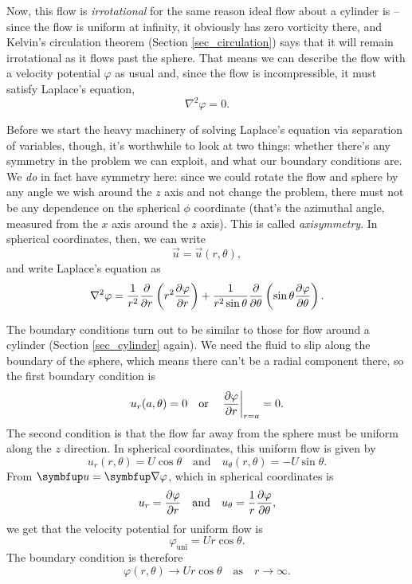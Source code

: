 Now, this flow is \emph{irrotational} for the same reason ideal flow about a cylinder is -- since the flow is uniform at infinity, it obviously has zero vorticity there, and Kelvin's circulation theorem (Section \ref{sec_circulation}) says that it will remain irrotational as it flows past the sphere.  That means we can describe the flow with a velocity potential $\varphi$ as usual and, since the flow is incompressible, it must satisfy Laplace's equation,
\[
\nabla^2 \varphi = 0.
\]

Before we start the heavy machinery of solving Laplace's equation via separation of variables, though, it's worthwhile to look at two things:  whether there's any symmetry in the problem we can exploit, and what our boundary conditions are.  We \emph{do} in fact have symmetry here:  since we could rotate the flow and sphere by any angle we wish around the $z$ axis and not change the problem, there must not be any dependence on the spherical $\phi$ coordinate (that's the azimuthal angle, measured from the $x$ axis around the $z$ axis).  This is called \emph{axisymmetry}.  In spherical coordinates, then, we can write
\begin{equation}
\vec{u} = \vec{u}(r, \theta),
\end{equation}
and write Laplace's equation as
\begin{equation}
\label{eq_laplace_sph}
\nabla^2 \varphi = \frac{1}{r^2} \frac{\partial {}}{\partial {r}} \left( r^2 \frac{\partial {\varphi}}{\partial {r}} \right) + \frac{1}{r^2 \sin \theta} \frac{\partial {}}{\partial {\theta}} \left(\sin \theta \frac{\partial {\varphi}}{\partial {\theta}} \right).
\end{equation}

The boundary conditions turn out to be similar to those for flow around a cylinder (Section \ref{sec_cylinder} again).  We need the fluid to slip along the boundary of the sphere, which means there can't be a radial component there, so the first boundary condition is
\begin{equation}
\label{eq_sphere_bc1}
u_r(a, \theta) = 0 \quad \text{or} \quad \left. \frac{\partial {\varphi}}{\partial {r}} \right|_{r=a} = 0.
\end{equation}
The second condition is that the flow far away from the sphere must be uniform along the $z$ direction.  In spherical coordinates, this uniform flow is given by
\begin{equation}
\label{eq_sphere_uni}
u_r(r, \theta) = U\cos \theta \quad \text{and} \quad u_\theta(r, \theta) = -U \sin \theta.
\end{equation}
From $\vec{u} = \grad \varphi$, which in spherical coordinates is
\[
u_r = \frac{\partial {\varphi}}{\partial {r}} \quad \text{and} \quad u_\theta = \frac{1}{r} \frac{\partial {\varphi}}{\partial {\theta}},
\]
we get that the velocity potential for uniform flow is 
\[
\varphi_\text{uni} = U r \cos \theta.
\]
The boundary condition is therefore
\begin{equation}
\label{eq_sphere_bc2}
\varphi(r, \theta) \to Ur \cos \theta \quad \text{as} \quad r \to \infty.
\end{equation}

